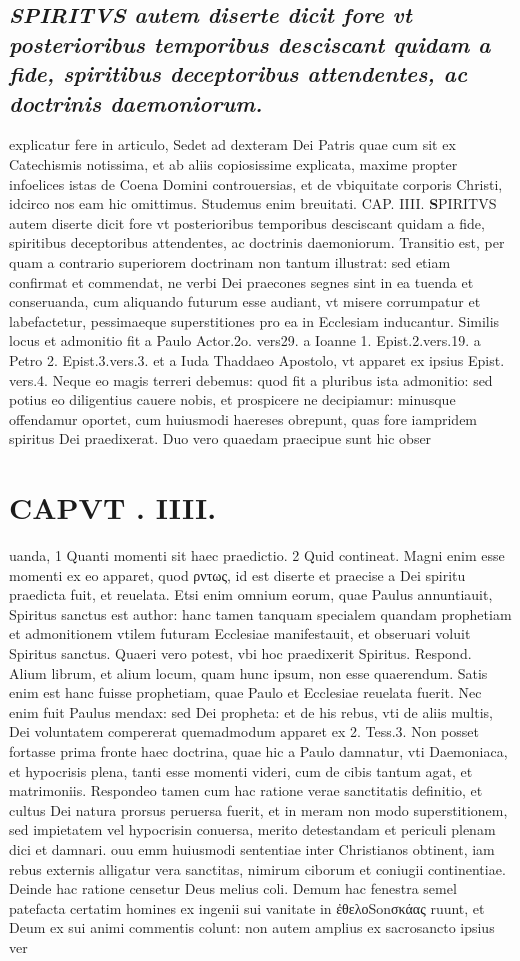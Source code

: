 \documentclass{article}
\begin{document}
\begin{pages}
\subsection*{\textit{SPIRITVS autem diserte dicit fore vt posterioribus temporibus desciscant quidam a fide, spiritibus deceptoribus attendentes, ac doctrinis daemoniorum.}}explicatur fere in articulo, Sedet ad dexteram Dei Patris quae cum sit ex Catechismis notissima, et ab aliis copiosissime explicata, maxime propter infoelices istas de Coena Domini controuersias, et de vbiquitate corporis Christi, idcirco nos eam hic omittimus. Studemus enim breuitati. CAP. IIII. 
\textbf{S}PIRITVS autem diserte dicit fore vt posterioribus temporibus desciscant quidam a fide, spiritibus deceptoribus attendentes, ac doctrinis daemoniorum. Transitio est, per quam a contrario superiorem doctrinam non tantum illustrat: sed etiam confirmat et commendat, ne verbi Dei praecones segnes sint in ea tuenda et conseruanda, cum aliquando futurum esse audiant, vt misere corrumpatur et labefactetur, pessimaeque superstitiones pro ea in Ecclesiam inducantur. Similis locus et admonitio fit a Paulo Actor.2o. vers29. a Ioanne 1. Epist.2.vers.19. a Petro 2. Epist.3.vers.3. et a Iuda Thaddaeo Apostolo, vt apparet ex ipsius Epist. vers.4. Neque eo magis terreri debemus: quod fit a pluribus ista admonitio: sed potius eo diligentius cauere nobis, et prospicere ne decipiamur: minusque offendamur oportet, cum huiusmodi haereses obrepunt, quas fore iampridem spiritus Dei praedixerat. Duo vero quaedam praecipue sunt hic obser\pend
\section*{CAPVT . IIII. }
\marginpar{[ p.181 ]}\pstart uanda, 1 Quanti momenti sit haec praedictio. 2 Quid contineat. Magni enim esse momenti ex eo apparet, quod ρντως, id est diserte et praecise a Dei spiritu praedicta fuit, et reuelata. Etsi enim omnium eorum, quae Paulus annuntiauit, Spiritus sanctus est author: hanc tamen tanquam specialem quandam prophetiam et admonitionem vtilem futuram Ecclesiae manifestauit, et obseruari voluit Spiritus sanctus. Quaeri vero potest, vbi hoc praedixerit Spiritus. Respond. Alium librum, et alium locum, quam hunc ipsum, non esse quaerendum. Satis enim est hanc fuisse prophetiam, quae Paulo et Ecclesiae reuelata fuerit. Nec enim fuit Paulus mendax: sed Dei propheta: et de his rebus, vti de aliis multis, Dei voluntatem compererat quemadmodum apparet ex 2. Tess.3. Non posset fortasse prima fronte haec doctrina, quae hic a Paulo damnatur, vti Daemoniaca, et hypocrisis plena, tanti esse momenti videri, cum de cibis tantum agat, et matrimoniis. Respondeo tamen cum hac ratione verae sanctitatis definitio, et cultus Dei natura prorsus peruersa fuerit, et in meram non modo superstitionem, sed impietatem vel hypocrisin conuersa, merito detestandam et periculi plenam dici et damnari. ouu emm huiusmodi sententiae inter Christianos obtinent, iam rebus externis alligatur vera sanctitas, nimirum ciborum et coniugii continentiae. Deinde hac ratione censetur Deus melius coli. Demum hac fenestra semel patefacta certatim homines ex ingenii sui vanitate in ἐθελοSonσκάας ruunt, et Deum ex sui animi commentis colunt: non autem amplius ex sacrosancto ipsius ver\pend

\end{pages}
\end{document}
